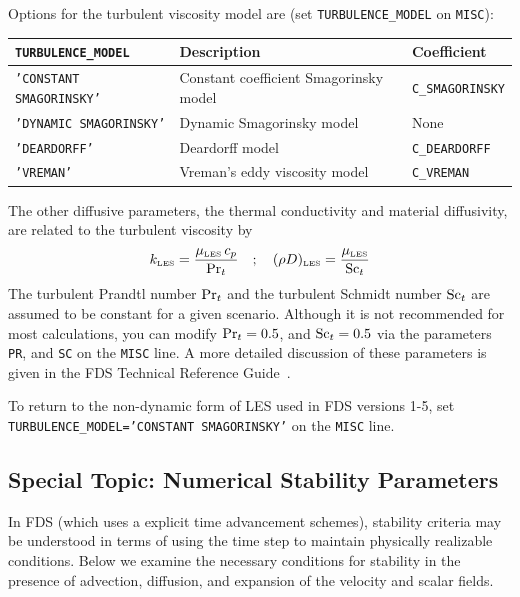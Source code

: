 \documentclass[11pt]{book}
\newcommand{\ct}{\tt\small}
\newcommand{\be}{\begin{equation}}
\newcommand{\ee}{\end{equation}}
\newcommand{\PR}{\hbox{Pr}}
\newcommand{\SC}{\hbox{Sc}}
\begin{document}
Options for the turbulent viscosity model are (set {\ct TURBULENCE\_MODEL} on {\ct MISC}):
\begin{center}
\begin{tabular}{|lll|}
\hline
{\ct TURBULENCE\_MODEL}         & Description                                                   & Coefficient           \\ \hline
{\ct 'CONSTANT SMAGORINSKY'}    & Constant coefficient Smagorinsky model \cite{Smagorinsky:1}   & {\ct C\_SMAGORINSKY}  \\
{\ct 'DYNAMIC SMAGORINSKY'}     & Dynamic Smagorinsky model \cite{Germano:1991,Moin:1991}       & None                  \\
{\ct 'DEARDORFF'}               & Deardorff model \cite{Deardorff:1980,Pope:2000}               & {\ct C\_DEARDORFF}    \\
{\ct 'VREMAN'}                  & Vreman's eddy viscosity model \cite{Vreman:2004}              & {\ct C\_VREMAN}       \\ \hline
\end{tabular}
\end{center}
The other diffusive parameters, the thermal conductivity and material diffusivity, are related to the turbulent viscosity by
\be k_{\hbox{\tiny LES}} = \frac{\mu_{\hbox{\tiny LES}} \, c_p}{\PR_t}
\quad ; \quad  (\rho D)_{\hbox{\tiny LES}} =\frac{\mu_{\hbox{\tiny LES}}}{\SC_t} \ee
The turbulent Prandtl number $\PR_t$ and the turbulent Schmidt number $\SC_t$ are assumed to be constant for a given scenario. Although it is not recommended for most calculations, you can modify $\PR_t=0.5$, and $\SC_t=0.5$ via the parameters {\ct PR}, and {\ct SC} on the {\ct MISC} line. A more detailed discussion of these parameters is given in the FDS Technical Reference Guide~\cite{FDS_Math_Guide}.

\begin{warning}
\noindent
To return to the non-dynamic form of LES used in FDS versions 1-5, set {\ct TURBULENCE\_MODEL='CONSTANT SMAGORINSKY'} on the {\ct MISC} line.
\end{warning}


\subsection{Special Topic: Numerical Stability Parameters}
\label{info:CFL}

In FDS (which uses a explicit time advancement schemes), stability criteria may be understood in terms of using the time step to maintain physically realizable conditions.
Below we examine the necessary conditions for stability in the presence of advection, diffusion, and expansion of the velocity and scalar fields.
\end{document}
